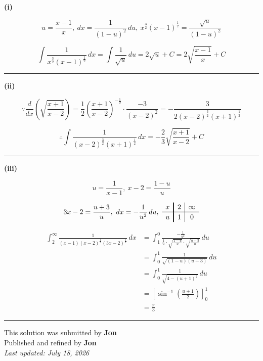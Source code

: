 \documentclass[12pt]{article}
\begin{document}
\newcommand{\ds}{\displaystyle}

\textbf{(i)}

$$u=\frac{x-1}{x},\ dx=\frac1{(1-u)^2}\,du,\ x^{\frac32}(x-1)^{\frac12}=\frac{\sqrt u}{(1-u)^2}$$

$$\int \frac1{x^{\frac32}(x-1)^{\frac12}}\,dx=\int \frac1{\sqrt u}\,du=2\sqrt u+C=2\sqrt{\frac{x-1}{x}}+C$$

\bigskip\hrule\bigskip

\textbf{(ii)}


$$\because \frac{d}{dx}\left(\sqrt{\frac{x+1}{x-2}}\right)=\frac12\left(\frac{x+1}{x-2}\right)^{-\frac12}\cdot \frac{-3}{(x-2)^2}=-\frac3{2(x-2)^{\frac32}(x+1)^{\frac12}}$$

$$\therefore \int \frac1{(x-2)^{\frac32}(x+1)^{\frac12}}\,dx
=-\frac23\sqrt{\frac{x+1}{x-2}}+C$$

\bigskip\hrule\bigskip

\textbf{(iii)}

$$u=\frac1{x-1},\ x-2=\frac{1-u}{u}$$

$$3x-2=\frac{u+3}{u},\ dx=-\frac1{u^2}\,du,\ 
\renewcommand{\arraystretch}{1.1}
\begin{array}{c!{\vrule width 1.2pt}c|c}
x & 2 & \infty\\
\hline
\rule[-4pt]{0pt}{14pt}
u & 1 & 0
\end{array}
$$

\begin{align*}
\int_2^\infty \frac1{(x-1)(x-2)^{\frac12}(3x-2)^{\frac12}}\,dx
&=\int_1^0
\frac{-\frac1{u^2}}
{\frac1u\cdot \sqrt{\frac{1-u}{u}}\cdot \sqrt{\frac{u+3}{u}}}\,du\\
&=\int_0^1 \frac1{\sqrt{(1-u)(u+3)}}\,du\\
&=\int_0^1 \frac1{\sqrt{4-(u+1)^2}}\,du\\
&=\left[\sin^{-1}\left(\frac{u+1}{2}\right)\right]_{0}^{1}\\
&=\frac{\pi}{3}
\end{align*}


\bigskip
\hrule
\begin{center}
    This solution was submitted by \textbf{Jon}\\[4pt]
    Published and refined by \textbf{Jon}\\[8pt]
    \textit{Last updated: July 18, 2026}
\end{center}
\end{document}
